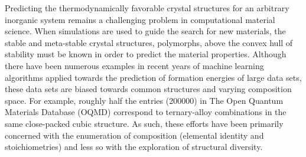 %
Predicting the thermodynamically favorable crystal structures for an arbitrary inorganic system remains a challenging problem in computational material science.\cite{Woodley2008}
%
%
When simulations are used to guide the search for new materials, the stable and meta-stable crystal structures,  polymorphs,  above the convex hull of stability must be known in order to predict the material properties.\cite{}
Although there have been numerous examples in recent years of machine learning algorithms applied towards the prediction of formation energies of large  data sets,
these data sets are biased towards common structures and varying composition space.\cite{}
For example, roughly half the entries (\mytilde\num{200000}) in The Open Quantum Materials Database (OQMD) correspond to ternary-alloy combinations in the same close-packed cubic structure.
As such, these efforts have been primarily concerned with the enumeration of composition (elemental identity and stoichiometries) and less so with the exploration of structural diversity.
%
%


